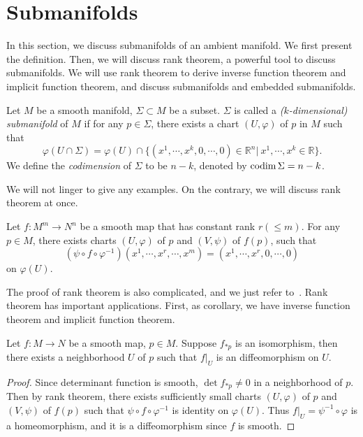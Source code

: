 \section{Submanifolds}

In this section, we discuss submanifolds of an ambient manifold.
We first present the definition.
Then, we will discuss rank theorem, a powerful tool to discuss submanifolds.
We will use rank theorem to derive inverse function theorem and implicit function theorem, and discuss submanifolds and embedded submanifolds.

\begin{defn}
    Let $M$ be a smooth manifold, $\Sigma\subset M$ be a subset.
    $\Sigma$ is called a \emph{($k$-dimensional) submanifold} of $M$ if for any $p\in\Sigma$, there exists a chart $(U,\varphi)$ of $p$ in $M$ such that 
    \[\varphi(U\cap\Sigma)=\varphi(U)\cap\{(x^1,\cdots,x^k,0,\cdots,0)\in\mathbb{R}^n|\ x^1,\cdots,x^k\in\mathbb{R}\}.\]
    We define the \emph{codimension} of $\Sigma$ to be $n-k$, denoted by $\operatorname{codim}\Sigma=n-k$.
\end{defn}

We will not linger to give any examples.
On the contrary, we will discuss rank theorem at once.

\begin{thm}
    Let $f:M^m\to N^n$ be a smooth map that has constant rank $r(\leq m)$.
    For any $p\in M$, there exists charts $(U,\varphi)$ of $p$ and $(V,\psi)$ of $f(p)$, such that
    \[(\psi\circ f\circ\varphi^{-1})(x^1,\cdots,x^r,\cdots,x^m)=(x^1,\cdots,x^r,0,\cdots,0)\]
    on $\varphi(U)$.
\end{thm}

The proof of rank theorem is also complicated, and we just refer to~\cite[Theorem~4.12]{LeeSM}.
Rank theorem has important applications.
First, as corollary, we have inverse function theorem and implicit function theorem.
\begin{thm}
    Let $f:M\to N$ be a smooth map, $p\in M$.
    Suppose $f_{*p}$ is an isomorphism, then there exists a neighborhood $U$ of $p$ such that $f|_U$ is an diffeomorphism on $U$.
\end{thm}
\begin{proof}
    Since determinant function is smooth, $\det{f_{*p}}\neq 0$ in a neighborhood of $p$.
    Then by rank theorem, there exists sufficiently small charts $(U,\varphi)$ of $p$ and $(V,\psi)$ of $f(p)$ such that $\psi\circ f\circ\varphi^{-1}$ is identity on $\varphi(U)$.
    Thus $f|_U=\psi^{-1}\circ\varphi$ is a homeomorphism, and it is a diffeomorphism since $f$ is smooth.
\end{proof}

